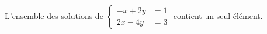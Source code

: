 L'ensemble des solutions de $\begin{cases} -x+2y &= 1 \\ 2x-4y &= 3 \end{cases}$ contient un seul élément.

\begin{reponses}
\end{reponses}

